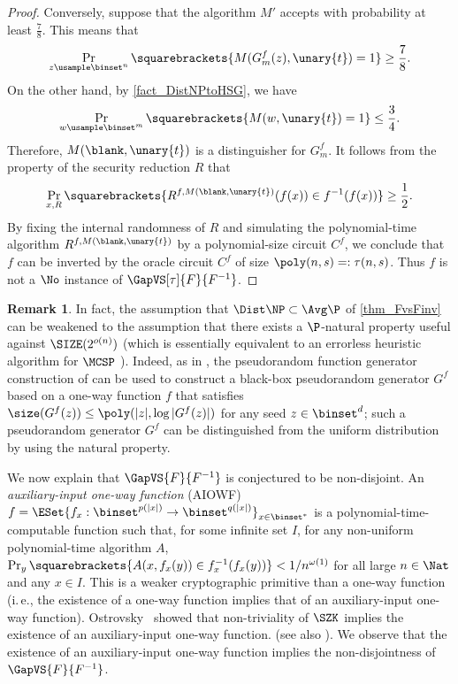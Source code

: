 \documentclass[11pt]{article}
\numberwithin{equation}{section}
\theoremstyle{definition}
\newtheorem{remark}[theorem]{Remark}
\theoremstyle{plain}
\newcommand{\ie}{i.\,e.}
\begin{document}
\begin{proof}
  Conversely, suppose that
  the algorithm $M'$ accepts with probability at least $\frac{7}{8}$.
  This means that
  $$
    \Pr_{z \usample \binset^n} \squarebrackets{ M(G^f_{m}(z), \unary{t}) = 1 } \ge \frac{7}{8}.
  $$
  On the other hand, by \cref{fact_DistNPtoHSG}, we have
  $$
    \Pr_{w \usample \binset^m} \squarebrackets{ M(w, \unary{t}) = 1 } \le \frac{3}{4}.
  $$
  Therefore, $M( \blank, \unary{t})$ is a distinguisher for $G_{ m}^f$.
  It follows from the property of the security reduction $R$
  that
  $$
    \Pr_{x, R} \squarebrackets{ R^{f, M(\blank, \unary{t})}(f(x)) \in f^{-1}(f(x)) } \ge \frac{1}{2}.
  $$
  By fixing the internal randomness of $R$ and
  simulating the polynomial-time algorithm $R^{f, M(\blank, \unary{t})}$ by a polynomial-size circuit $C^f$,
  we conclude that $f$ can be inverted by the oracle circuit $C^f$ of size $\poly(n, s) =: \tau(n, s)$.
  Thus $f$ is not a $\No$ instance of $\GapVS[\tau]{F}{F^{-1}}$.
\end{proof}

\begin{remark}
  In fact, the assumption that $\Dist\NP \subset \Avg\P$ of \cref{thm_FvsFinv} can be weakened to
  the assumption that there exists a $\P$-natural property useful against $\SIZE(2^{o(n)})$ (which is essentially equivalent to
  an errorless heuristic algorithm for $\MCSP$ \cite{HiraharaS17_coco_conf,Hirahara18_focs_conf}).
  Indeed,
  as in \cite{AllenderBKMR06_siamcomp_journals,RazborovR97_jcss_journals,AllenderH19_toct_journals},
  the pseudorandom function generator construction of \cite{GoldreichGM86_jacm_journals}
  can be used to construct a black-box pseudorandom generator $G^f$ based on a one-way function $f$
  that satisfies
  $\size(G^f(z)) \le \poly(|z|, \log |G^f(z)|)$ for any seed $z \in \binset^d$;
  such a pseudorandom generator $G^f$ can be distinguished from the uniform distribution by using the natural property.
\end{remark}

We now explain that $\GapVS{F}{F^{-1}}$ is conjectured to be non-disjoint.
An \emph{auxiliary-input one-way function} (AIOWF) $f = \ESet{ f_x : \binset^{p(|x|)} \to \binset^{q(|x|)} }_{x \in \binset^*}$
is
a polynomial-time-computable function such that,
for some infinite set $I$,
for any non-uniform polynomial-time algorithm $A$,
$\Pr_y \squarebrackets{ A(x, f_x(y)) \in f_x^{-1}(f_x(y)) } < 1 / n^{\omega(1)}$ for all large $n \in \Nat$ and any $x \in I$.
This is
a weaker cryptographic primitive than a one-way function (\ie, the existence of a one-way function implies that of an auxiliary-input one-way function).
Ostrovsky~\cite{Ostrovsky91_coco_conf}
showed that non-triviality of $\SZK$ implies the existence of an auxiliary-input one-way function.
(see also \cite{Vadhan06_siamcomp_journals}).
We observe that the existence of an auxiliary-input one-way function implies the non-disjointness of $\GapVS{F}{F^{-1}}$.
\end{document}
